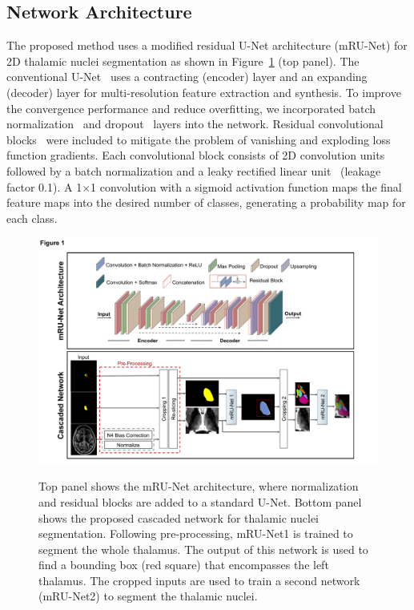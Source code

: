 \subsection{Network Architecture}
The proposed method uses a modified residual U-Net architecture (mRU-Net) for 2D thalamic nuclei segmentation as shown in Figure~\ref{Thalamus.Fig.1.Architecture}  (top panel). The conventional U-Net~\cite{1921968:27964317} uses a contracting (encoder) layer and an expanding (decoder) layer for multi-resolution feature extraction and synthesis. To improve the convergence performance and reduce overfitting, we incorporated batch normalization~\cite{1921968:27964353} and dropout~\cite{1921968:27964320} layers into the network. Residual convolutional blocks~\cite{1921968:27964363} were included to mitigate the problem of vanishing and exploding loss function gradients. Each convolutional block consists of 2D convolution units followed by a batch normalization and a leaky rectified linear unit~\cite{1921968:27964368} (leakage factor 0.1). A 1$\times$1 convolution with a sigmoid activation function maps the final feature maps into the desired number of classes, generating a probability map for each class.


\begin{figure}[!htbp]
\centering\includegraphics[width=\textwidth]{figures/pdf/slide1.pdf}\label{Thalamus.Fig.1.Architecture}
\caption{Top panel shows the mRU-Net architecture, where normalization and residual blocks are added to a standard U-Net. Bottom panel shows the proposed cascaded network for thalamic nuclei segmentation. Following pre-processing, mRU-Net1 is trained to segment the whole thalamus. The output of this network is used to find a bounding box (red square) that encompasses the left thalamus. The cropped inputs are used to train a second network (mRU-Net2) to segment the thalamic nuclei.}
\end{figure}

